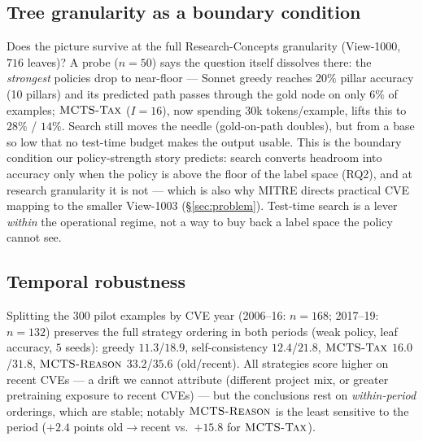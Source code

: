 \subsection{Tree granularity as a boundary condition}
\label{sec:granularity}
Does the picture survive at the full Research-Concepts granularity (View-1000,
$716$ leaves)? A probe ($n{=}50$) says the question itself dissolves there: the
\emph{strongest} policies drop to near-floor --- Sonnet greedy reaches $20\%$
pillar accuracy (10 pillars) and its predicted path passes through the gold node
on only $6\%$ of examples; $\textsc{MCTS-Tax}$ ($I{=}16$), now spending $30$k
tokens/example, lifts this to $28\%$ / $14\%$. Search still moves the needle
(gold-on-path doubles), but from a base so low that no test-time budget makes
the output usable. This is the boundary condition our policy-strength story
predicts: search converts headroom into accuracy only when the policy is above
the floor of the label space (RQ2), and at research granularity it is not ---
which is also why MITRE directs practical CVE mapping to the smaller View-1003
(\S\ref{sec:problem}). Test-time search is a lever \emph{within} the
operational regime, not a way to buy back a label space the policy cannot see.

\subsection{Temporal robustness}
Splitting the $300$ pilot examples by CVE year (2006--16: $n{=}168$; 2017--19:
$n{=}132$) preserves the full strategy ordering in both periods
(weak policy, leaf accuracy, $5$ seeds): greedy $11.3$/$18.9$,
self-consistency $12.4$/$21.8$, $\textsc{MCTS-Tax}$ $16.0$/$31.8$, $\textsc{MCTS-Reason}$
$33.2$/$35.6$ (old/recent). All strategies score higher on recent CVEs --- a
drift we cannot attribute (different project mix, or greater pretraining
exposure to recent CVEs) --- but the conclusions rest on \emph{within-period}
orderings, which are stable; notably $\textsc{MCTS-Reason}$ is the least sensitive to the
period ($+2.4$ points old$\to$recent vs.\ $+15.8$ for $\textsc{MCTS-Tax}$).